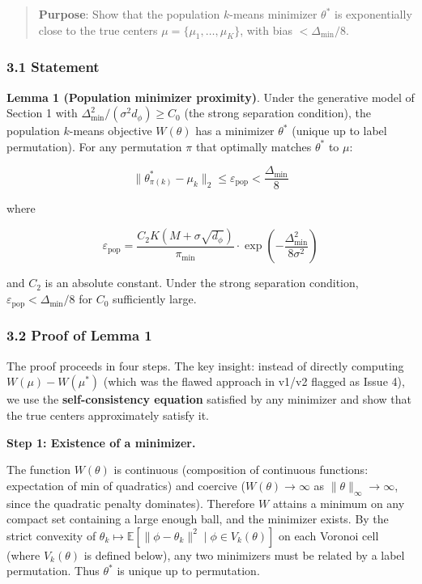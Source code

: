 \documentclass[
  12pt,
]{article}
\begin{document}
\begin{quote}
\textbf{Purpose}: Show that the population \(k\)-means minimizer
\(\theta^*\) is exponentially close to the true centers
\(\mu = \{\mu_1,\dots,\mu_K\}\), with bias \(< \Delta_{\min}/8\).
\end{quote}

\subsubsection{3.1 Statement}\label{statement}

\textbf{Lemma 1 (Population minimizer proximity)}. Under the generative
model of Section 1 with \(\Delta_{\min}^2 / (\sigma^2 d_\phi) \geq C_0\)
(the strong separation condition), the population \(k\)-means objective
\(W(\theta)\) has a minimizer \(\theta^*\) (unique up to label
permutation). For any permutation \(\pi\) that optimally matches
\(\theta^*\) to \(\mu\):

\[\|\theta^*_{\pi(k)} - \mu_k\|_2 \leq \varepsilon_{\text{pop}} < \frac{\Delta_{\min}}{8}\]

where

\[\varepsilon_{\text{pop}} = \frac{C_2 K (M + \sigma\sqrt{d_\phi})}{\pi_{\min}} \cdot \exp\left(-\frac{\Delta_{\min}^2}{8\sigma^2}\right)\]

and \(C_2\) is an absolute constant. Under the strong separation
condition, \(\varepsilon_{\text{pop}} < \Delta_{\min}/8\) for \(C_0\)
sufficiently large.

\subsubsection{3.2 Proof of Lemma 1}\label{proof-of-lemma-1}

The proof proceeds in four steps. The key insight: instead of directly
computing \(W(\mu) - W(\mu^*)\) (which was the flawed approach in v1/v2
flagged as Issue 4), we use the \textbf{self-consistency equation}
satisfied by any minimizer and show that the true centers approximately
satisfy it.

\textbf{Step 1: Existence of a minimizer.}

The function \(W(\theta)\) is continuous (composition of continuous
functions: expectation of min of quadratics) and coercive
(\(W(\theta) \to \infty\) as \(\|\theta\|_\infty \to \infty\), since the
quadratic penalty dominates). Therefore \(W\) attains a minimum on any
compact set containing a large enough ball, and the minimizer exists. By
the strict convexity of
\(\theta_k \mapsto \mathbb{E}[\|\phi - \theta_k\|^2 \mid \phi \in V_k(\theta)]\)
on each Voronoi cell (where \(V_k(\theta)\) is defined below), any two
minimizers must be related by a label permutation. Thus \(\theta^*\) is
unique up to permutation.
\end{document}
